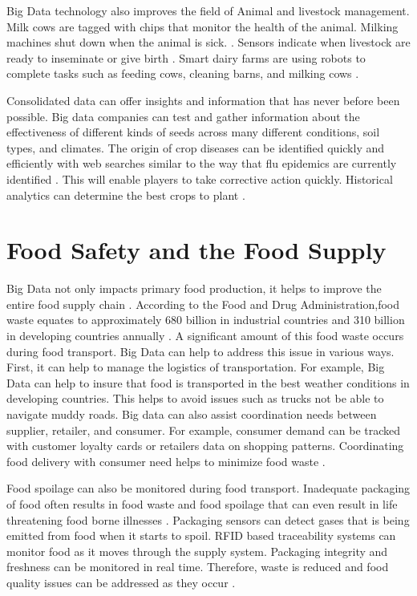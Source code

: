 \documentclass[sigconf]{acmart}
\begin{document}
Big Data technology also improves the field of Animal and livestock management. Milk cows are tagged with chips that monitor the health of the animal. Milking machines shut down when the animal is sick. \cite{DevEcon}.  Sensors indicate when livestock are ready to inseminate or give birth \cite{www-google-Digital}. Smart dairy farms are using robots to complete tasks such as feeding cows, cleaning barns, and milking cows \cite{Wolfert}. 

Consolidated data can offer insights and information that has never before been possible. Big data companies can test and gather information about the effectiveness of different kinds of seeds across many different conditions, soil types, and climates. The origin of crop diseases can be identified quickly and efficiently with web searches similar to the way that flu epidemics are currently identified \cite{www-google-Farm}. This will enable players to take corrective action quickly. Historical analytics can determine the best crops to plant \cite{Wolfert}. 


\section{Food Safety and the Food Supply}

Big Data not only impacts primary food production, it helps to improve the entire food supply chain \cite{Wolfert}. According to the Food and Drug Administration,food waste equates to approximately 680 billion in industrial countries and 310 billion in developing countries annually \cite{DevEcon}.  A significant amount of this food waste occurs during food transport. Big Data can help to address this issue in various ways. First, it can help to manage the logistics of transportation. For example, Big Data can help to insure that food is transported in the best weather conditions in developing countries.  This helps to avoid issues such as trucks not be able to navigate muddy roads. Big data can also assist coordination needs between supplier, retailer, and consumer. For example, consumer demand can be tracked with customer loyalty cards or retailers data on shopping patterns.  Coordinating food delivery with consumer need helps to minimize food waste \cite{DevEcon}.

Food spoilage can also be monitored during food transport. Inadequate packaging of food often results in food waste and food spoilage that can even result in life threatening food borne illnesses \cite{www-google-bigdatatech}.  Packaging sensors can detect gases that is being emitted from food when it starts to spoil.  RFID based traceability systems can monitor food as it moves through the supply system. Packaging integrity and freshness can be monitored in real time. Therefore, waste is reduced and food quality issues can be addressed as they occur \cite{www-google-bigdatatech}. 
\end{document}
